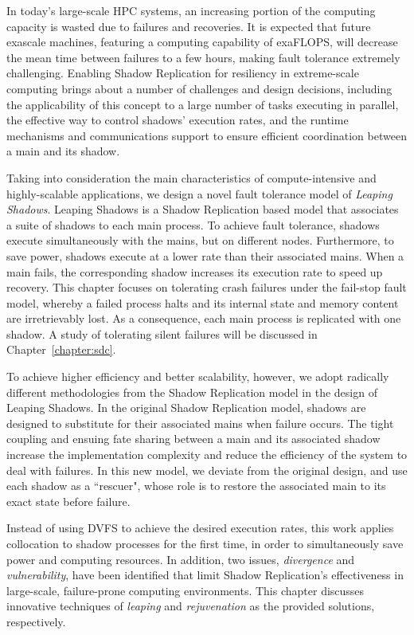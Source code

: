 In today's large-scale HPC systems, an increasing portion of the computing capacity is wasted due to failures and recoveries. It is expected
that future exascale machines,  featuring a computing capability of exaFLOPS, will decrease the mean time between
failures to a few hours, making fault tolerance extremely challenging. 
Enabling Shadow Replication for resiliency in extreme-scale computing 
brings about a number of challenges and design decisions, including the applicability of this concept to a large number of 
tasks executing in parallel, the effective way to control shadows' execution rates, and the runtime mechanisms and 
communications support to ensure efficient coordination between a 
main and its shadow.


Taking into consideration the main characteristics of compute-intensive and highly-scalable applications, we design a novel fault tolerance model of \textit{Leaping Shadows}. Leaping Shadows is a Shadow Replication based model that associates a suite of shadows
to each main process. To achieve fault tolerance, shadows
execute simultaneously with the mains, but on different
nodes. Furthermore, to save power, shadows execute at a
lower rate than their associated mains. When a main fails,
the corresponding shadow increases its execution rate to speed up recovery.
This chapter focuses on tolerating crash failures under the fail-stop fault model, 
whereby a failed process halts and its internal state and
memory content are irretrievably lost. As a consequence, each main process is replicated with one shadow.  A study of tolerating silent failures will be discussed in Chapter~\ref{chapter:sdc}. 

To achieve higher efficiency and better scalability, however, we adopt radically different methodologies from the Shadow Replication model in the design of Leaping Shadows.
In the original Shadow Replication model, shadows are designed to
substitute for their associated mains when failure occurs. The tight coupling and ensuing fate sharing between a main and its associated shadow increase the implementation complexity and reduce the efficiency of
the system to deal with failures.
In this new model, we deviate from the original design, and use each shadow as a ``rescuer", whose role is to restore the associated main
to its exact state before failure.

Instead of using DVFS to achieve the desired execution rates, this work applies collocation to shadow processes for the first time, in order to simultaneously save power and computing resources. In addition, two issues, \textit{divergence} and \textit{vulnerability}, have been identified that limit Shadow Replication's effectiveness in large-scale, failure-prone computing environments. This chapter discusses innovative techniques of {\it leaping} and {\it  rejuvenation} as the provided solutions, respectively. %

